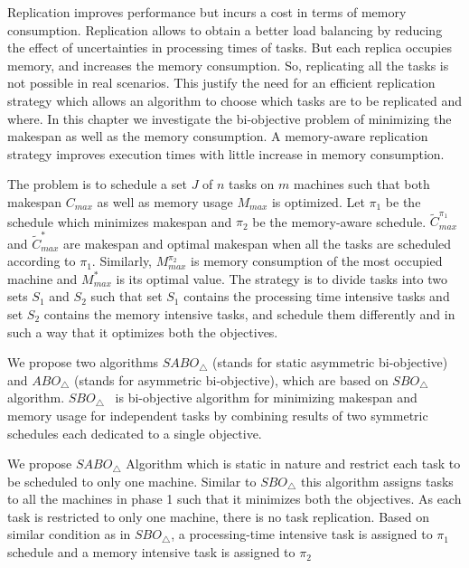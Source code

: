 \label{ch5}
\label{Intro}

 Replication improves performance but incurs a cost in terms of memory consumption.  
 Replication allows to obtain a better load balancing by reducing the effect of 
 uncertainties in processing times of tasks. But each replica occupies memory, and increases the memory consumption. 
 So, replicating all the tasks is not possible in real scenarios. This justify the need for an efficient replication 
 strategy which allows an algorithm to choose which tasks are to be replicated and where.
 In this chapter we investigate the bi-objective problem of minimizing the makespan as well as the memory consumption. A memory-aware replication strategy improves execution times with little increase in memory consumption. 

 The problem is to schedule a set $J$ of $n$ tasks on $m$ machines such that both makespan $C_{max}$ as well as memory usage $M_{max}$ is optimized.  
  Let $\pi_1$ be the schedule  which minimizes makespan and $\pi_2$ be the memory-aware schedule. $\tilde{C}^{\pi_1}_{max}$ and $\tilde{C}^{*}_{max}$ are makespan and optimal makespan when all the tasks are scheduled according to $\pi_1$. Similarly, $M^{\pi_2}_{max}$ is  memory consumption of the most  occupied machine and $M^*_{max}$ is its optimal value. The strategy is to divide tasks into two sets $S_1$ and $S_2$ such that set $S_1$ contains the processing time intensive tasks and set $S_2$ contains the memory intensive tasks, and schedule them differently and in such a way that it optimizes both the objectives. 
  
  We propose two algorithms $SABO_\triangle$ (stands for static asymmetric bi-objective) and $ABO_\triangle$ (stands for asymmetric bi-objective), which are based on $SBO_\triangle$ algorithm. $SBO_\triangle$~\citet{10.1109/IPDPS.2008.4536292} is bi-objective algorithm for minimizing makespan and memory usage for independent tasks by combining results of two symmetric schedules each dedicated to a single objective.
  
                  
                  We propose $SABO_\triangle$ Algorithm which is static in nature and restrict each task to be scheduled to only one machine. Similar to $SBO_\triangle$ this algorithm assigns tasks to all the machines in phase 1 such that it minimizes both the objectives. As each task is restricted to only one machine, there is no task replication. Based on similar condition as in $SBO_\triangle$, a processing-time intensive task is assigned to $\pi_1$ schedule and a memory intensive task is assigned to $\pi_2$
                  

